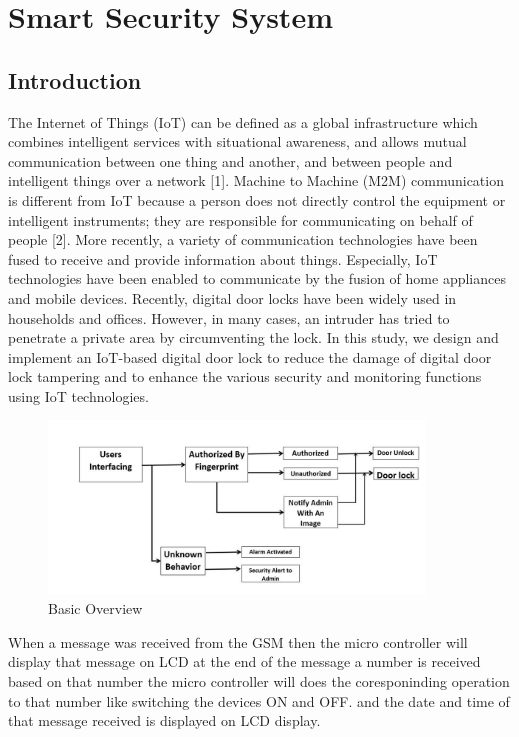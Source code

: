 \documentclass[twoside,a4paper,16pt]{book}
\begin{document}
{{\newpage
\chapter{Smart Security System}
\section{Introduction}
The Internet of Things (IoT) can be defined as a global infrastructure which combines
intelligent services with situational awareness, and allows mutual communication
between one thing and another, and between people and intelligent things over a network
[1]. Machine to Machine (M2M) communication is different from IoT because a person
does not directly control the equipment or intelligent instruments; they are responsible for
communicating on behalf of people [2].
More recently, a variety of communication technologies have been fused to receive and
provide information about things. Especially, IoT technologies have been enabled to
communicate by the fusion of home appliances and mobile devices.
Recently, digital door locks have been widely used in households and offices.
However, in many cases, an intruder has tried to penetrate a private area by circumventing
the lock. In this study, we design and implement an IoT-based digital door lock to reduce
the damage of digital door lock tampering and to enhance the various security and
monitoring functions using IoT technologies.

\begin{figure}[ht!]
	\begin{center}
		\includegraphics[width=10.0cm]{b1.jpg}
		\caption{Basic Overview}
	\end{center}
\end{figure}
When a message was received from the GSM then the micro controller will display that message on LCD at the end
of the message a number is received based on that number the micro controller will does the coresponinding operation
to that number like switching the devices ON and OFF. and the date and time of that message received is displayed
on LCD display.
}}
\end{document}
